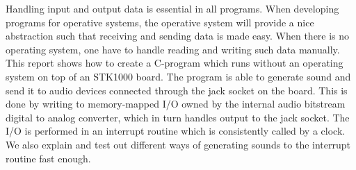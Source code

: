 Handling input and output data is essential in all programs. When
developing programs for operative systems, the operative system will
provide a nice abstraction such that receiving and sending data is made
easy. When there is no operating system, one have to handle reading and
writing such data manually. This report shows how to create a C-program
which runs without an operating system on top of an STK1000 board. The
program is able to generate sound and send it to audio devices connected
through the jack socket on the board. This is done by writing to
memory-mapped I/O owned by the internal audio bitstream digital to
analog converter, which in turn handles output to the jack socket. The
I/O is performed in an interrupt routine which is consistently called by
a clock. We also explain and test out different ways of generating
sounds to the interrupt routine fast enough.
